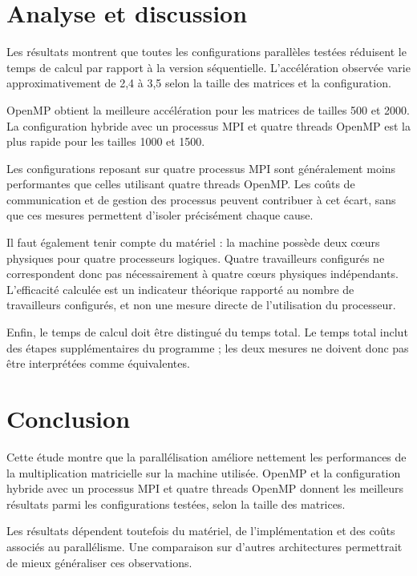 \documentclass[11pt,a4paper]{article}
\begin{document}
	\section{Analyse et discussion}
	
	Les résultats montrent que toutes les configurations parallèles testées
	réduisent le temps de calcul par rapport à la version séquentielle.
	L'accélération observée varie approximativement de 2,4 à 3,5 selon la
	taille des matrices et la configuration.
	
	OpenMP obtient la meilleure accélération pour les matrices de tailles
	500 et 2000. La configuration hybride avec un processus MPI et quatre
	threads OpenMP est la plus rapide pour les tailles 1000 et 1500.
	
	Les configurations reposant sur quatre processus MPI sont généralement
	moins performantes que celles utilisant quatre threads OpenMP. Les coûts
	de communication et de gestion des processus peuvent contribuer à cet
	écart, sans que ces mesures permettent d'isoler précisément chaque cause.
	
	Il faut également tenir compte du matériel : la machine possède deux
	cœurs physiques pour quatre processeurs logiques. Quatre travailleurs
	configurés ne correspondent donc pas nécessairement à quatre cœurs
	physiques indépendants. L'efficacité calculée est un indicateur théorique
	rapporté au nombre de travailleurs configurés, et non une mesure directe
	de l'utilisation du processeur.
	
	Enfin, le temps de calcul doit être distingué du temps total. Le temps
	total inclut des étapes supplémentaires du programme ; les deux mesures
	ne doivent donc pas être interprétées comme équivalentes.
	
	\section{Conclusion}
	
	Cette étude montre que la parallélisation améliore nettement les
	performances de la multiplication matricielle sur la machine utilisée.
	OpenMP et la configuration hybride avec un processus MPI et quatre
	threads OpenMP donnent les meilleurs résultats parmi les configurations
	testées, selon la taille des matrices.
	
	Les résultats dépendent toutefois du matériel, de l'implémentation et
	des coûts associés au parallélisme. Une comparaison sur d'autres
	architectures permettrait de mieux généraliser ces observations.
	
\end{document}
